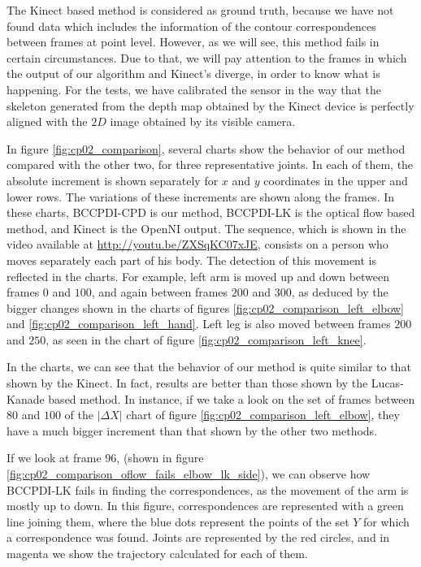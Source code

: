 The Kinect based method is considered as ground truth, because we have not found data which includes the information of 
the contour correspondences between frames at point level. However, as we will see, this method fails in certain circumstances. Due to that, we will pay attention to the frames in which the output of 
our algorithm and Kinect's diverge, in order to know what is happening. For the tests, we have calibrated the sensor in 
the way that the skeleton generated from the depth map obtained by the Kinect device is perfectly aligned with the $2D$ 
image obtained by its visible camera.

In figure \ref{fig:cp02_comparison}, several charts show the behavior of our method compared with the other two, for three 
representative joints. In each of them, the absolute increment is shown separately for $x$ and $y$ coordinates in the 
upper and lower rows. The variations of these increments are shown along the frames. In these charts, BCCPDI-CPD is 
our method, BCCPDI-LK is the optical flow based method, and Kinect is the OpenNI output. The sequence, which is shown in 
the video available at \url{http://youtu.be/ZXSqKC07xJE}, consists on a person who moves separately each part of 
his body. The detection of this movement is reflected in the charts. For example, left arm is moved up and down between 
frames $0$ and $100$, and again between frames $200$ and $300$, as deduced by the bigger changes shown in the charts of 
figures \ref{fig:cp02_comparison_left_elbow} and \ref{fig:cp02_comparison_left_hand}. Left leg is also moved between frames $200$ 
and $250$, as seen in the chart of figure \ref{fig:cp02_comparison_left_knee}.

In the charts, we can see that the behavior of our method is quite similar to that shown by the Kinect. In fact, results are better than those shown by the Lucas-Kanade based method. In instance, if we take a look on the set of 
frames between $80$ and $100$ of the $|\Delta X|$ chart of figure \ref{fig:cp02_comparison_left_elbow}, they have a much 
bigger increment than that shown by the other two methods. 

If we look at frame $96$, (shown in figure \ref{fig:cp02_comparison_oflow_fails_elbow_lk_side}), we can observe how BCCPDI-LK fails in finding the correspondences, as 
the movement of the arm is mostly up to down. In this figure, correspondences are represented with a green line joining 
them, where the blue dots represent the points of the set $Y$ for which a correspondence was found. Joints are represented by the red circles, and in magenta 
we show the trajectory calculated for each of them. 


